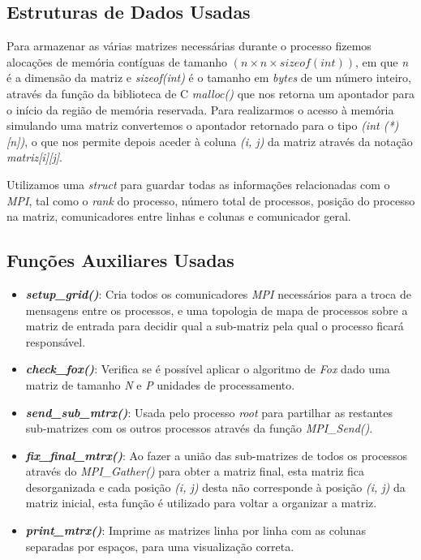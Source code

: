 \documentclass{llncs}
\begin{document}
\subsection{Estruturas de Dados Usadas}

Para armazenar as várias matrizes necessárias durante o processo fizemos alocações de memória contíguas de tamanho $(n\times n\times sizeof(int))$, em que \textit{n} é a dimensão da matriz e \textit{sizeof(int)} é o tamanho em \textit{bytes} de um número inteiro, através da função da biblioteca de C \textit{malloc()} que nos retorna um apontador para o início da região de memória reservada. Para realizarmos o acesso à memória simulando uma matriz convertemos o apontador retornado para o tipo \textit{(int (*)[n])}, o que nos permite depois aceder à coluna \textit{(i, j)} da matriz através da notação \textit{matriz[i][j]}.

Utilizamos uma \textit{struct} para guardar todas as informações relacionadas com o \textit{MPI}, tal como o \textit{rank} do processo, número total de processos, posição do processo na matriz, comunicadores entre linhas e colunas e comunicador geral.

\subsection{Funções Auxiliares Usadas}

\begin{itemize}
\item \textit{\textbf{setup\_grid()}}: Cria todos os comunicadores \textit{MPI} necessários para a troca de mensagens entre os processos, e uma topologia de mapa de processos sobre a matriz de entrada para decidir qual a sub-matriz pela qual o processo ficará responsável. \\

\item \textit{\textbf{check\_fox()}}: Verifica se é possível aplicar o algoritmo de \textit{Fox} dado uma matriz de tamanho \textit{N} e \textit{P} unidades de processamento. \\

\item \textit{\textbf{send\_sub\_mtrx()}}: Usada pelo processo \textit{root} para partilhar as restantes sub-matrizes com os outros processos através da função \textit{MPI\_Send()}. \\

\item \textit{\textbf{fix\_final\_mtrx()}}: Ao fazer a união das sub-matrizes de todos os processos através do \textit{MPI\_Gather()} para obter a matriz final, esta matriz fica desorganizada e cada posição \textit{(i, j)} desta não corresponde à posição \textit{(i, j)} da matriz inicial, esta função é utilizado para voltar a organizar a matriz. \\

\item \textit{\textbf{print\_mtrx()}}: Imprime as matrizes linha por linha com as colunas separadas por espaços, para uma visualização correta.
\end{itemize}
\end{document}
